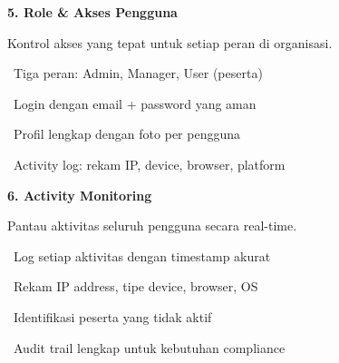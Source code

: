 \documentclass[a4paper]{article}
\begin{document}
\vspace{8pt}

\noindent
\begin{minipage}[t]{0.485\textwidth}
    \colorbox{OrangePrimary}{%
        \begin{minipage}{\dimexpr\textwidth-14pt}
            \vspace{5pt}
            {\fontsize{10}{13}\selectfont\bfseries\color{White} 5. Role \& Akses Pengguna}
            \vspace{5pt}
        \end{minipage}}
    \vspace{5pt}
    {\fontsize{9}{12}\selectfont\color{TextDark}%
    Kontrol akses yang tepat untuk setiap peran di organisasi.\par\vspace{3pt}
    \textbullet\ Tiga peran: Admin, Manager, User (peserta)\par\vspace{2pt}%
    \textbullet\ Login dengan email + password yang aman\par\vspace{2pt}%
    \textbullet\ Profil lengkap dengan foto per pengguna\par\vspace{2pt}%
    \textbullet\ Activity log: rekam IP, device, browser, platform}%
\end{minipage}%
\hfill
\begin{minipage}[t]{0.485\textwidth}
    \colorbox{VioletDark}{%
        \begin{minipage}{\dimexpr\textwidth-14pt}
            \vspace{5pt}
            {\fontsize{10}{13}\selectfont\bfseries\color{White} 6. Activity Monitoring}
            \vspace{5pt}
        \end{minipage}}
    \vspace{5pt}
    {\fontsize{9}{12}\selectfont\color{TextDark}%
    Pantau aktivitas seluruh pengguna secara real-time.\par\vspace{3pt}
    \textbullet\ Log setiap aktivitas dengan timestamp akurat\par\vspace{2pt}%
    \textbullet\ Rekam IP address, tipe device, browser, OS\par\vspace{2pt}%
    \textbullet\ Identifikasi peserta yang tidak aktif\par\vspace{2pt}%
    \textbullet\ Audit trail lengkap untuk kebutuhan compliance}%
\end{minipage}
\end{document}
